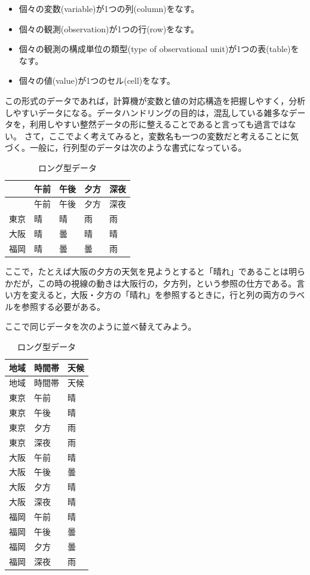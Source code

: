 \documentclass[
  a4paper,
]{ltjsbook}
\providecommand{\tightlist}{%
  \setlength{\itemsep}{0pt}\setlength{\parskip}{0pt}}\usepackage{longtable,booktabs,array}
\begin{document}
\begin{itemize}
\tightlist
\item
  個々の変数(variable)が1つの列(column)をなす。
\item
  個々の観測(observation)が1つの行(row)をなす。
\item
  個々の観測の構成単位の類型(type of observational
  unit)が1つの表(table)をなす。
\item
  個々の値(value)が1つのセル(cell)をなす。
\end{itemize}

この形式のデータであれば，計算機が変数と値の対応構造を把握しやすく，分析しやすいデータになる。データハンドリングの目的は，混乱している雑多なデータを，利用しやすい整然データの形に整えることであると言っても過言ではない。
さて，ここでよく考えてみると，変数名も一つの変数だと考えることに気づく。一般に，行列型のデータは次のような書式になっている。

\begin{longtable}[]{@{}lllll@{}}
\caption{ロング型データ}\tabularnewline
\toprule\noalign{}
& 午前 & 午後 & 夕方 & 深夜 \\
\midrule\noalign{}
\endfirsthead
\toprule\noalign{}
& 午前 & 午後 & 夕方 & 深夜 \\
\midrule\noalign{}
\endhead
\bottomrule\noalign{}
\endlastfoot
東京 & 晴 & 晴 & 雨 & 雨 \\
大阪 & 晴 & 曇 & 晴 & 晴 \\
福岡 & 晴 & 曇 & 曇 & 雨 \\
\end{longtable}

ここで，たとえば大阪の夕方の天気を見ようとすると「晴れ」であることは明らかだが，この時の視線の動きは大阪行の，夕方列，という参照の仕方である。言い方を変えると，大阪・夕方の「晴れ」を参照するときに，行と列の両方のラベルを参照する必要がある。

ここで同じデータを次のように並べ替えてみよう。

\begin{longtable}[]{@{}lll@{}}
\caption{ロング型データ}\tabularnewline
\toprule\noalign{}
地域 & 時間帯 & 天候 \\
\midrule\noalign{}
\endfirsthead
\toprule\noalign{}
地域 & 時間帯 & 天候 \\
\midrule\noalign{}
\endhead
\bottomrule\noalign{}
\endlastfoot
東京 & 午前 & 晴 \\
東京 & 午後 & 晴 \\
東京 & 夕方 & 雨 \\
東京 & 深夜 & 雨 \\
大阪 & 午前 & 晴 \\
大阪 & 午後 & 曇 \\
大阪 & 夕方 & 晴 \\
大阪 & 深夜 & 晴 \\
福岡 & 午前 & 晴 \\
福岡 & 午後 & 曇 \\
福岡 & 夕方 & 曇 \\
福岡 & 深夜 & 雨 \\
\end{longtable}
\end{document}
